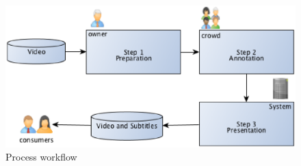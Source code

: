 
\begin{figure}[h]
	\centerline{\includegraphics[scale=0.4] {figure/workflow-01}}
	\caption{Process workflow}
	\label{process}
\end{figure}
